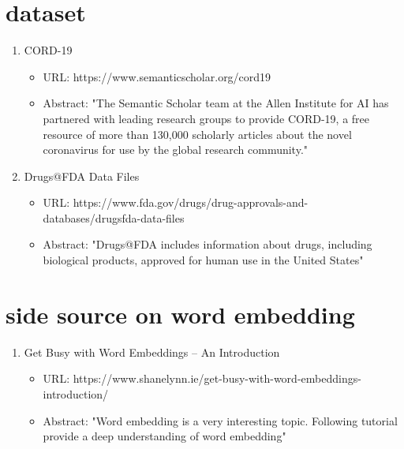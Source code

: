\documentclass{article}
\begin{document}
\section{dataset}
\begin{enumerate}
  \item CORD-19
    \begin{itemize}
    \item URL: https://www.semanticscholar.org/cord19
    \item Abstract: "The Semantic Scholar team at the Allen Institute for AI has partnered with leading research groups to provide CORD-19, a free resource of more than 130,000 scholarly articles about the novel coronavirus for use by the global research community."
    \end{itemize}
   \item Drugs@FDA Data Files
    \begin{itemize}
    \item URL: https://www.fda.gov/drugs/drug-approvals-and-databases/drugsfda-data-files
    \item Abstract: "Drugs@FDA includes information about drugs, including biological products, approved for human use in the United States"
    \end{itemize}
\end{enumerate}\textbf{}

\section{side source on word embedding}
\begin{enumerate}
  \item Get Busy with Word Embeddings – An Introduction
    \begin{itemize}
    \item URL: https://www.shanelynn.ie/get-busy-with-word-embeddings-introduction/
    \item Abstract: "Word embedding is a very interesting topic. Following tutorial provide a deep understanding of word embedding"
    \end{itemize}
\end{enumerate}\textbf{}
\end{document}
